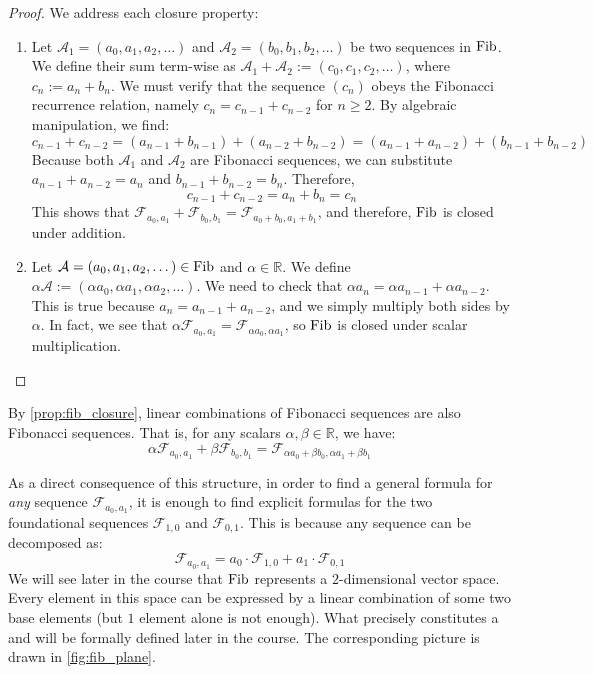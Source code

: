 \begin{proof}
We address each closure property:
\begin{enumerate}[label=\textbf{(\alph*)}]
    \item Let $\mathcal{A}_1 = (a_0, a_1, a_2, \dots)$ and $\mathcal{A}_2 = (b_0, b_1, b_2, \dots)$ be two sequences in $\operatorname{Fib}$. We define their sum term-wise as $\mathcal{A}_1 + \mathcal{A}_2 := (c_0, c_1, c_2, \dots)$, where $c_n := a_n + b_n$. We must verify that the sequence $(c_n)$ obeys the Fibonacci recurrence relation, namely $c_n = c_{n-1} + c_{n-2}$ for $n \ge 2$. By algebraic manipulation, we find:
\[
c_{n-1} + c_{n-2} = (a_{n-1} + b_{n-1}) + (a_{n-2} + b_{n-2}) = (a_{n-1} + a_{n-2}) + (b_{n-1} + b_{n-2})
\]
Because both $\mathcal{A}_1$ and $\mathcal{A}_2$ are Fibonacci sequences, we can substitute $a_{n-1} + a_{n-2} = a_n$ and $b_{n-1} + b_{n-2} = b_n$. Therefore,
\[
c_{n-1} + c_{n-2} = a_n + b_n = c_n
\]
This shows that $\mathcal{F}_{a_0, a_1} + \mathcal{F}_{b_0, b_1} = \mathcal{F}_{a_0 + b_0, a_1 + b_1}$, and therefore, $\operatorname{Fib}$ is closed under addition.

    \item Let $\mathcal{A} = (a_0, a_1, a_2, \dots) \in \operatorname{Fib}$ and $\alpha \in \mathbb{R}$. We define $\alpha \mathcal{A} := (\alpha a_0, \alpha a_1, \alpha a_2, \dots)$. We need to check that $\alpha a_n = \alpha a_{n-1} + \alpha a_{n-2}$. This is true because $a_n = a_{n-1} + a_{n-2}$, and we simply multiply both sides by $\alpha$. In fact, we see that $\alpha \mathcal{F}_{a_0, a_1} = \mathcal{F}_{\alpha a_0, \alpha a_1}$, so $\operatorname{Fib}$ is closed under scalar multiplication.
\end{enumerate}
\end{proof}

\begin{corollary}
\label{cor:fib_linear_combination}
By \cref{prop:fib_closure}, linear combinations of Fibonacci sequences are also Fibonacci sequences. That is, for any scalars $\alpha, \beta \in \mathbb{R}$, we have:
\[
\alpha \mathcal{F}_{a_0, a_1} + \beta \mathcal{F}_{b_0, b_1} = \mathcal{F}_{\alpha a_0 + \beta b_0, \alpha a_1 + \beta b_1}
\]
\end{corollary}

\begin{remark}
As a direct consequence of this structure, in order to find a general formula for \textit{any} sequence $\mathcal{F}_{a_0, a_1}$, it is enough to find explicit formulas for the two foundational sequences $\mathcal{F}_{1,0}$ and $\mathcal{F}_{0,1}$. This is because any sequence can be decomposed as:
\[
\mathcal{F}_{a_0, a_1} = a_0 \cdot \mathcal{F}_{1,0} + a_1 \cdot \mathcal{F}_{0,1}
\]
We will see later in the course that $\operatorname{Fib}$ represents a $2$-dimensional vector space. Every element in this space can be expressed by a linear combination of some two base elements (but $1$ element alone is not enough). What precisely constitutes a  and  will be formally defined later in the course. The corresponding picture is drawn in \cref{fig:fib_plane}.
\end{remark}

